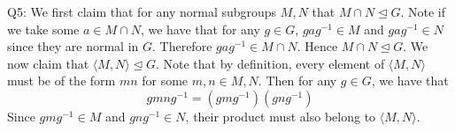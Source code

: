 \documentclass[letterpaper]{article}
\newcommand{\lan}{\langle}
\newcommand{\ran}{\rangle}
\newcommand{\inn}[1]{\lan#1\ran}
\begin{document}
\noindent
Q5: We first claim that for any normal subgroups $M,N$ that $M \cap N \trianglelefteq G$. Note if we take some $a\in M\cap N$, we have that for any $g\in G$, $gag^{-1}\in M$ and $gag^{-1}\in N$ since they are normal in $G$. Therefore $gag^{-1} \in M \cap N$. Hence $M\cap N \trianglelefteq G$. We now claim that $\inn{M,N}\trianglelefteq G$. Note that by definition, every element of $\inn{M,N}$ must be of the form $mn$ for some $m,n\in M,N$. Then for any $g\in G$, we have that $$gmng^{-1} = (gmg^{-1})(gng^{-1})$$
Since $gmg^{-1}\in M$ and $gng^{-1}\in N$, their product must also belong to $\inn{M,N}$. 
\end{document}
